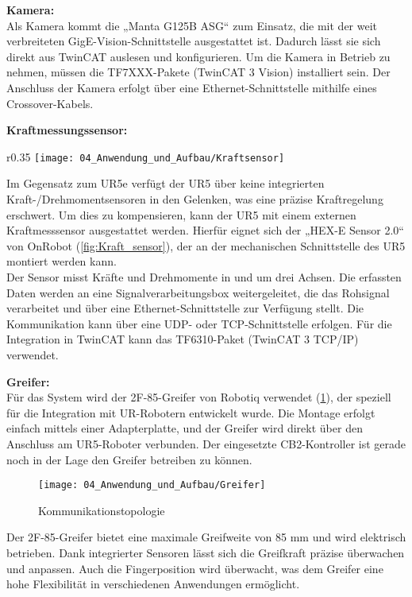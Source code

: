 	\textbf{Kamera:}
	\vspace{2mm} 
	\\
	Als Kamera kommt die „Manta G125B ASG“ zum Einsatz, die mit der weit verbreiteten GigE-Vision-Schnittstelle ausgestattet ist. Dadurch lässt sie sich direkt aus TwinCAT auslesen und konfigurieren. Um die Kamera in Betrieb zu nehmen, müssen die TF7XXX-Pakete (TwinCAT 3 Vision) installiert sein. Der Anschluss der Kamera erfolgt über eine Ethernet-Schnittstelle mithilfe eines Crossover-Kabels.
	
	\textbf{Kraftmessungssensor:}
	\vspace{2mm} 
	\vspace{-3mm} 
	\vspace{-\baselineskip}
	\vspace{-\baselineskip}
	\\
	\begin{wrapfigure}{r}{0.35\textwidth}
		\centering
		\texttt{[image: 04\_Anwendung\_und\_Aufbau/Kraftsensor]}
		\captionsetup{justification=centering}
		\caption{Kraftsensor}
		\label{fig:Kraft_sensor}
	\end{wrapfigure} \par
	Im Gegensatz zum UR5e verfügt der UR5 über keine integrierten Kraft-/Drehmomentsensoren in den Gelenken, was eine präzise Kraftregelung erschwert. Um dies zu kompensieren, kann der UR5 mit einem externen Kraftmesssensor ausgestattet werden. Hierfür eignet sich der „HEX-E Sensor 2.0“ von OnRobot (\ref{fig:Kraft_sensor}), der an der mechanischen Schnittstelle des UR5 montiert werden kann. 
	\\
	Der Sensor misst Kräfte und Drehmomente in und um drei Achsen. Die erfassten Daten werden an eine Signalverarbeitungsbox weitergeleitet, die das Rohsignal verarbeitet und über eine Ethernet-Schnittstelle zur Verfügung stellt. Die Kommunikation kann über eine UDP- oder TCP-Schnittstelle erfolgen. Für die Integration in TwinCAT kann das TF6310-Paket (TwinCAT 3 TCP/IP) verwendet.
	
	\textbf{Greifer:}
	\vspace{2mm} 
	\\
	Für das System wird der 2F-85-Greifer von Robotiq verwendet (\ref{fig:Greifer}), der speziell für die Integration mit UR-Robotern entwickelt wurde. Die Montage erfolgt einfach mittels einer Adapterplatte, und der Greifer wird direkt über den Anschluss am UR5-Roboter verbunden. Der eingesetzte CB2-Kontroller ist gerade noch in der Lage den Greifer betreiben zu können. 
	
	\begin{figure}[h!]
		\centering
		\texttt{[image: 04\_Anwendung\_und\_Aufbau/Greifer]}
		\captionsetup{justification=centering}
		\caption{Kommunikationstopologie}
		\label{fig:Greifer}
	\end{figure}
	
	Der 2F-85-Greifer bietet eine maximale Greifweite von 85 mm und wird elektrisch betrieben. Dank integrierter Sensoren lässt sich die Greifkraft präzise überwachen und anpassen. Auch die Fingerposition wird überwacht, was dem Greifer eine hohe Flexibilität in verschiedenen Anwendungen ermöglicht.